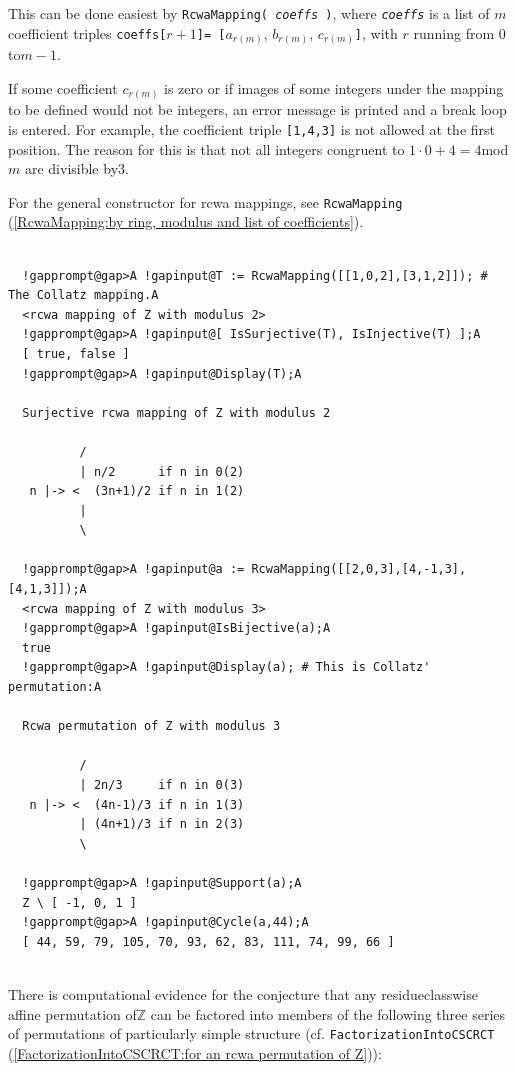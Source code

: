 \documentclass[a4paper,11pt]{report}
\begin{document}
{{ This can be done easiest by \texttt{RcwaMapping( \mbox{\texttt{\mdseries\slshape coeffs}} )}, where \mbox{\texttt{\mdseries\slshape coeffs}} is a list of $m$ coefficient triples \texttt{coeffs[}$r+1$\texttt{]{\nobreakspace}= [}$a_{r(m)}$, $b_{r(m)}$, $c_{r(m)}$\texttt{]}, with $r$ running from 0 to{\nobreakspace}$m-1$. 

 If some coefficient $c_{r(m)}$ is zero or if images of some integers under the mapping to be defined would
not be integers, an error message is printed and a break loop is entered. For
example, the coefficient triple \texttt{[1,4,3]} is not allowed at the first position. The reason for this is that not all
integers congruent to $1 \cdot 0 + 4 = 4${\nobreakspace}mod{\nobreakspace}$m$ are divisible by{\nobreakspace}3. 

 For the general constructor for rcwa mappings, see \texttt{RcwaMapping} (\ref{RcwaMapping:by ring, modulus and list of coefficients}). 
\begin{Verbatim}[commandchars=!@A,fontsize=\small,frame=single,label=Example]
  
  !gapprompt@gap>A !gapinput@T := RcwaMapping([[1,0,2],[3,1,2]]); # The Collatz mapping.A
  <rcwa mapping of Z with modulus 2>
  !gapprompt@gap>A !gapinput@[ IsSurjective(T), IsInjective(T) ];A
  [ true, false ]
  !gapprompt@gap>A !gapinput@Display(T);A
  
  Surjective rcwa mapping of Z with modulus 2
  
          /
          | n/2      if n in 0(2)
   n |-> <  (3n+1)/2 if n in 1(2)
          |
          \
  
  !gapprompt@gap>A !gapinput@a := RcwaMapping([[2,0,3],[4,-1,3],[4,1,3]]);A
  <rcwa mapping of Z with modulus 3>
  !gapprompt@gap>A !gapinput@IsBijective(a);A
  true
  !gapprompt@gap>A !gapinput@Display(a); # This is Collatz' permutation:A
  
  Rcwa permutation of Z with modulus 3
  
          /
          | 2n/3     if n in 0(3)
   n |-> <  (4n-1)/3 if n in 1(3)
          | (4n+1)/3 if n in 2(3)
          \
  
  !gapprompt@gap>A !gapinput@Support(a);A
  Z \ [ -1, 0, 1 ]
  !gapprompt@gap>A !gapinput@Cycle(a,44);A
  [ 44, 59, 79, 105, 70, 93, 62, 83, 111, 74, 99, 66 ]
  
\end{Verbatim}
 \noindent There is computational evidence for the conjecture that any
residue\texttt{}class\texttt{}wise affine permutation
of{\nobreakspace}{\ensuremath{\mathbb Z}} can be factored into members of the
following three series of permutations of particularly simple structure (cf. \texttt{FactorizationIntoCSCRCT} (\ref{FactorizationIntoCSCRCT:for an rcwa permutation of Z})): 

}}
\end{document}
